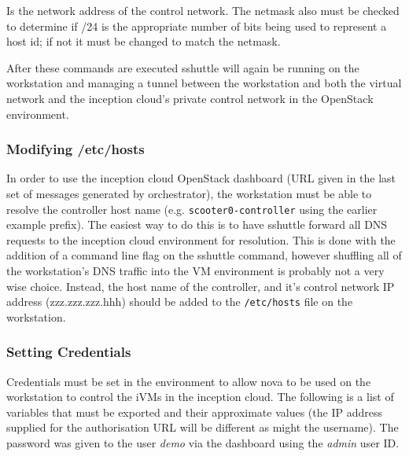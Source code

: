 \vspace{5pt}

\vspace{5pt}
 { 
	Is the network address of the control network. The netmask also must be checked to determine if /24 is 
	the appropriate number of bits being used to represent a host id; if not it must be changed to match the netmask.  
}

\vspace{5pt}
\dlend

After these commands are executed sshuttle will again be running on the workstation and managing a tunnel between the 
workstation and both the virtual network and the inception cloud's private control network in the OpenStack environment. 

\subsubsection{Modifying /etc/hosts}
In order to use the inception cloud OpenStack dashboard (URL given in the last set of messages generated by orchestrator),
the workstation must be able to resolve the 
controller host name (e.g. \verb!scooter0-controller! using the earlier example prefix).  
The easiest way to do this is to have sshuttle forward all DNS requests to the inception cloud environment for resolution. 
This is done with the addition of a command line flag on the sshuttle command, however shuffling all of the workstation's DNS
traffic into the VM environment is probably not a very wise choice. 
Instead, the host name of the controller, and it's control network IP address (zzz.zzz.zzz.hhh) should be added to the 
\verb!/etc/hosts! file on the workstation.   


\subsubsection{Setting Credentials}
Credentials must be set in the environment to allow nova to be used on the workstation to control the iVMs in the 
inception cloud.  
The following is a list of variables that must be exported and their approximate values (the IP address supplied for the 
authorisation URL will be different as might the username).  
The password was given to the user \emph{demo} via the dashboard using the \emph{admin} user ID.

